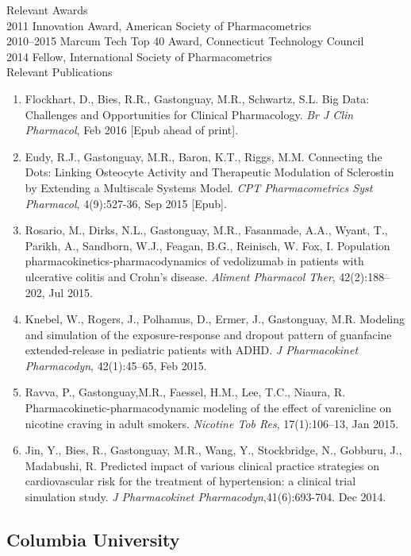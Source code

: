 \documentclass[11pt]{nih2016}
\begin{document}
\noindent
{\sc Relevant Awards} 
\\[2pt]
2011 Innovation Award, American Society of Pharmacometrics
\\
2010--2015 Marcum Tech Top 40 Award, Connecticut Technology Council
\\
2014 Fellow, International Society of Pharmacometrics
\\

\noindent
{\sc Relevant Publications}
\vspace*{-3pt}
\begin{enumerate}
\item Flockhart, D., Bies, R.R., Gastonguay, M.R., Schwartz, S.L. Big
  Data: Challenges and Opportunities for Clinical Pharmacology.  {\it
    Br J Clin Pharmacol}, Feb 2016 [Epub ahead of print].
\item Eudy, R.J., Gastonguay, M.R., Baron, K.T., Riggs,
  M.M. Connecting the Dots: Linking Osteocyte Activity and Therapeutic
  Modulation of Sclerostin by Extending a Multiscale Systems
  Model. {\it CPT Pharmacometrics Syst Pharmacol}, 4(9):527-36, Sep
  2015 [Epub].
\item Rosario, M., Dirks, N.L., Gastonguay, M.R., Fasanmade, A.A.,
  Wyant, T., Parikh, A., Sandborn, W.J., Feagan, B.G., Reinisch,
  W. Fox, I. Population pharmacokinetics-pharmacodynamics of
  vedolizumab in patients with ulcerative colitis and Crohn's
  disease. {\it Aliment Pharmacol Ther}, 42(2):188--202, Jul 2015.
\item Knebel, W., Rogers, J., Polhamus, D., Ermer, J., Gastonguay,
  M.R. Modeling and simulation of the exposure-response and dropout
  pattern of guanfacine extended-release in pediatric patients with
  ADHD. {\it J Pharmacokinet Pharmacodyn}, 42(1):45--65, Feb 2015.
\item Ravva, P., Gastonguay,M.R., Faessel, H.M., Lee, T.C., Niaura,
  R. Pharmacokinetic-pharmacodynamic modeling of the effect of
  varenicline on nicotine craving in adult smokers. {\it Nicotine Tob
    Res}, 17(1):106--13, Jan 2015.
\item Jin, Y., Bies, R., Gastonguay, M.R., Wang, Y., Stockbridge, N.,
  Gobburu, J., Madabushi, R. Predicted impact of various clinical
  practice strategies on cardiovascular risk for the treatment of
  hypertension: a clinical trial simulation study. {\it J
    Pharmacokinet Pharmacodyn},41(6):693-704. Dec 2014.
\end{enumerate}

\subsection{Columbia University}
\end{document}
